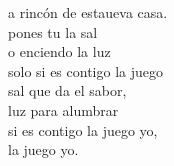 \begin{cancion}
\begin{chorus}
		a rincón de estaueva casa.\\
		 pones tu la sal \\
		o enciendo la luz\\
		 solo si es contigo  la juego\\
		 sal que da el sabor, \\
		luz para alumbrar\\
		 si es contigo  la juego yo,\\
		 la juego yo.\jump\\
	\end{chorus}%
\end{cancion}%
